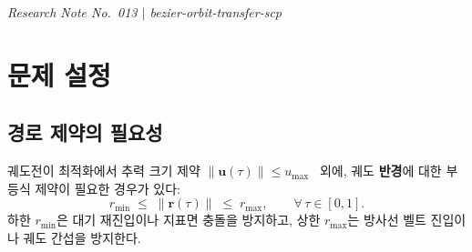 \documentclass[11pt]{article}
\begin{document}
\drawborder
\thispagestyle{firstpage}


{\normalsize\textit{Research Note No.~013 $|$ bezier-orbit-transfer-scp}}\par\medskip

\def\lighterdate{March 29, 2026}


\begin{abstract}
\cite{report005}에서 추력 크기 제약을 볼록껍질 성질과 극값 정리로 처리하였다.
본 노트에서는 이를 \textbf{위치/경로 제약}(궤도 반경 부등식)으로 확장한다.
위치 곡선은 차수 $N{+}2$의 베지어 곡선으로서 결정변수~$\mathbf{Z}$에 아핀이므로,
드 카스텔조 세분화로 구간별 부분 제어점을 추출하면 볼록껍질 성질에 의해
\textbf{구간 전체}에서의 제약 만족을 보장할 수 있다.
선형화 오차와 볼록껍질 간극의 보수성은 $O(1/K^2)$로,
$K{=}8$ 세분화가 실용적 기본값이다.
최종 제약은 $A_{\mathrm{ub}}\,\mathrm{vec}(\mathbf{Z}) \le \mathbf{b}_{\mathrm{ub}}$
형태의 선형 부등식으로, QP/SOCP에 직접 통합된다.
수치 검증은 \cite{report014}에서 보고한다.
\end{abstract}

\section{문제 설정}

\subsection{경로 제약의 필요성}

궤도전이 최적화에서 추력 크기 제약
$\|\mathbf{u}(\tau)\| \le u_{\max}$~\cite{report005}
외에, 궤도 \textbf{반경}에 대한 부등식 제약이 필요한 경우가 있다:
\begin{equation}\label{eq:path}
  r_{\min} \;\le\; \|\mathbf{r}(\tau)\| \;\le\; r_{\max},
  \qquad \forall\,\tau \in [0,1].
\end{equation}
하한 $r_{\min}$은 대기 재진입이나 지표면 충돌을 방지하고,
상한 $r_{\max}$는 방사선 벨트 진입이나 궤도 간섭을 방지한다.
\end{document}
